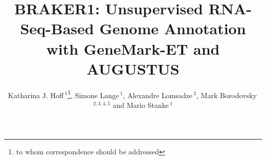 \documentclass{bioinfo}
\begin{document}

\title[BRAKER1]{BRAKER1: Unsupervised RNA-Seq-Based Genome Annotation with GeneMark-ET and AUGUSTUS}
\author[Hoff \textit{et~al}]{Katharina J. Hoff\,$^{1}$\footnote{to whom correspondence should be addressed}, Simone Lange\,$^{1}$, Alexandre Lomsadze\,$^{2}$, Mark Borodovsky\,$^{2,3,4,5}$ and Mario Stanke\,$^1$}
\address{$^{1}$Ernst Moritz Arndt Universit\"{a}t Greifswald, Institute for Mathematics and Computer Science, Walther-Rathenau-Stra\ss{}e 47, 17487 Greifswald, Germany\\
$^{2}$School of Computational Science and Engineering\\
$^{3}$Center for Bioinformatics and Computational Genomics, Georgia Institute of Technology, Atlanta, GA 30332, USA\\
$^{4}$Department of Biological and Medical Physics, Moscow Institute of Physics and Technology, Dolgoprudny, Moscow Region, Russia\\
$^{5}$Joint Georgia Tech and Emory University Wallace H Coulter Department of Biomedical Engineering, Atlanta, GA 30332, USA}



\maketitle
\end{document}
